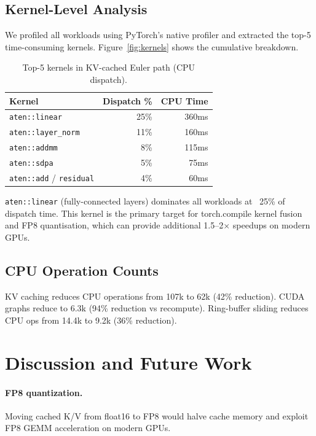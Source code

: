 \documentclass[letterpaper,twocolumn,10pt]{article}
\begin{document}
\subsection{Kernel-Level Analysis}

We profiled all workloads using PyTorch's native profiler and extracted
the top-5 time-consuming kernels.  Figure~\ref{fig:kernels} shows the
cumulative breakdown.

\begin{table}[t]
\centering
\caption{Top-5 kernels in KV-cached Euler path (CPU dispatch).}
\label{tab:kernels}
\begin{tabular}{@{}lrr@{}}
\toprule
\textbf{Kernel} & \textbf{Dispatch \%} & \textbf{CPU Time} \\
\midrule
\texttt{aten::linear} & 25\% & 360ms \\
\texttt{aten::layer\_norm} & 11\% & 160ms \\
\texttt{aten::addmm} & 8\% & 115ms \\
\texttt{aten::sdpa} & 5\% & 75ms \\
\texttt{aten::add} / \texttt{residual} & 4\% & 60ms \\
\bottomrule
\end{tabular}
\end{table}

\texttt{aten::linear} (fully-connected layers) dominates all workloads at
~25\% of dispatch time.  This kernel is the primary target for
torch.compile kernel fusion and FP8 quantisation, which can provide
additional 1.5--2$\times$ speedups on modern GPUs.

\subsection{CPU Operation Counts}

KV caching reduces CPU operations from 107k to 62k (42\% reduction).
CUDA graphs reduce to 6.3k (94\% reduction vs recompute).  Ring-buffer
sliding reduces CPU ops from 14.4k to 9.2k (36\% reduction).

\section{Discussion and Future Work}

\paragraph{FP8 quantization.}
Moving cached K/V from float16 to FP8 would halve cache memory
and exploit FP8 GEMM acceleration on modern GPUs.
\end{document}
